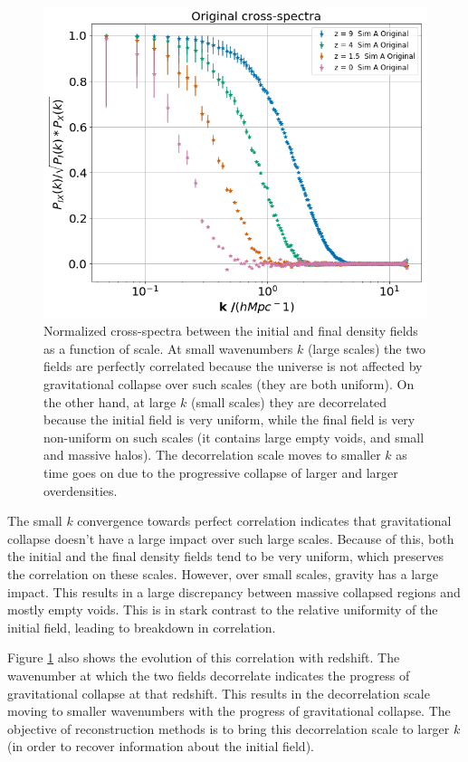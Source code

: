 \begin{figure}
    \centering
    \includegraphics[width=1\columnwidth]{images/perfRecon/orig.png}%
    
    \caption{
    Normalized cross-spectra between the initial and final density fields as a function of scale. At small wavenumbers $k$ (large scales) the two fields are perfectly correlated because the universe is not affected by gravitational collapse over such scales (they are both uniform). On the other hand, at large $k$ (small scales) they are decorrelated because the initial field is very uniform, while the final field is very non-uniform on such scales (it contains large empty voids, and small and massive halos). The decorrelation scale moves to smaller $k$ as time goes on due to the progressive collapse of larger and larger overdensities.
    }
    
    \label{fig:3.1}
\end{figure}

The small $k$ convergence towards perfect correlation indicates that gravitational collapse doesn't have a large impact over such large scales. Because of this, both the initial and the final density fields tend to be very uniform, which preserves the correlation on these scales. However, over small scales, gravity has a large impact. This results in a large discrepancy between massive collapsed regions and mostly empty voids. This is in stark contrast to the relative uniformity of the initial field, leading to breakdown in correlation.

Figure \ref{fig:3.1} also shows the evolution of this correlation with redshift. The wavenumber at which the two fields decorrelate indicates the progress of gravitational collapse at that redshift. This results in the decorrelation scale moving to smaller wavenumbers with the progress of gravitational collapse. The objective of reconstruction methods is to bring this decorrelation scale to larger $k$ (in order to recover information about the initial field).

